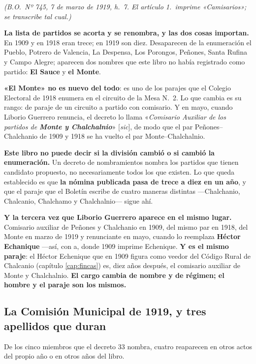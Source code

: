 \textit{(B.O.\ Nº 745, 7 de marzo de 1919, h.\ 7. El artículo 1.\ imprime «Camisarios»; se
transcribe tal cual.)}

\begin{cautela}
\textbf{La lista de partidos se acorta y se renombra, y las dos cosas importan.} En 1909 y en
1918 eran trece; en 1919 son diez. Desaparecen de la enumeración el Pueblo, Potrero de Valencia,
La Despensa, Los Porongos, Peñones, Santa Rufina y Campo Alegre; aparecen dos nombres que este
libro no había registrado como partido: \textbf{El Sauce} y \textbf{el Monte}.

\textbf{«El Monte» no es nuevo del todo}: es uno de los parajes que el Colegio Electoral de 1918
enumera en el circuito de la Mesa N.\ 2. Lo que cambia es su rango: de paraje de un circuito a
partido con comisario. Y en mayo, cuando Liborio Guerrero renuncia, el
decreto lo llama «\textit{Comisario Auxiliar de los partidos de \textbf{Monte y Chalchalnio}}»
[\textit{sic}], de modo que el par Peñones--Chalchanio de 1909 y 1918 se ha vuelto el par
Monte--Chalchalnio.

\textbf{Este libro no puede decir si la división cambió o si cambió la enumeración.} Un decreto
de nombramientos nombra los partidos que tienen candidato propuesto, no necesariamente todos los
que existen. Lo que queda establecido es que \textbf{la nómina publicada pasa de trece a diez en
un año}, y que el paraje que el Boletín escribe de cuatro maneras distintas ---Chalchanio,
Chalcanio, Chalchamo y Chalchalnio--- sigue ahí.
\end{cautela}

\textbf{Y la tercera vez que Liborio Guerrero aparece en el mismo lugar.} Comisario auxiliar de
Peñones y Chalchanio en 1909, del mismo par en 1918, del Monte en marzo de 1919 y renunciante en
mayo, cuando lo reemplaza \textbf{Héctor Echanique} ---así, con a, donde 1909 imprime Echenique.
\textbf{Y es el mismo paraje}: el Héctor Echenique que en 1909 figura como veedor del Código
Rural de Chalcanio (capítulo \ref{cap:fincas}) es, diez años después, el comisario auxiliar de
Monte y Chalchalnio. \textbf{El cargo cambia de nombre y de régimen; el hombre y el paraje son
los mismos.}

\subsection*{La Comisión Municipal de 1919, y tres apellidos que duran}

De los cinco miembros que el decreto 33 nombra, cuatro reaparecen en otros actos del propio año o
en otros años del libro.

